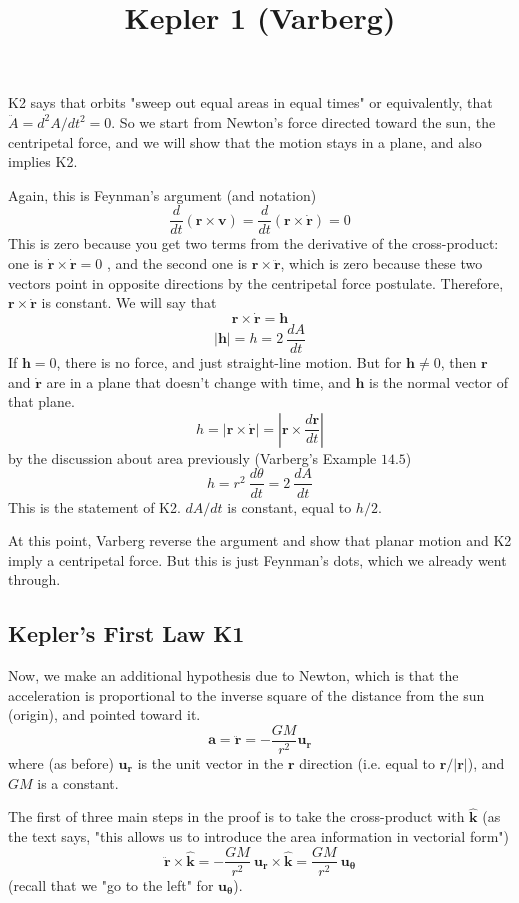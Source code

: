 \documentclass[11pt, oneside]{article}
\title{Kepler 1 (Varberg)}
\date{}
\begin{document}
\maketitle
\Large

K2 says that orbits "sweep out equal areas in equal times" or equivalently, that $\ddot{A} = d^2A/dt^2 = 0$.  So we start from Newton's force directed toward the sun, the centripetal force, and we will show that the motion stays in a plane, and also implies K2.

Again, this is Feynman's argument (and notation)
\[ \frac{d}{dt} ( \mathbf{r} \times \mathbf{v}) = \frac{d}{dt} ( \mathbf{r} \times \dot{\mathbf{r}}) = 0 \]
This is zero because you get two terms from the derivative of the cross-product:  one is $\dot{\mathbf{r}} \times \dot{\mathbf{r}} = 0$ , and the second one is $\mathbf{r} \times \ddot{\mathbf{r}}$, which is zero because these two vectors point in opposite directions by the centripetal force postulate.
Therefore,  $\mathbf{r} \times \dot{\mathbf{r}}$ is constant.  We will say that
\[ \mathbf{r} \times \dot{\mathbf{r}} = \mathbf{h} \]
\[ |\mathbf{h}| = h = 2 \ \frac{dA}{dt} \]
If $\mathbf{h} = 0$, there is no force, and just straight-line motion.  But for  $\mathbf{h} \ne 0$, then $\mathbf{r}$ and $\dot{\mathbf{r}}$ are in a plane that doesn't change with time, and $\mathbf{h}$ is the normal vector of that plane.
\[ h = | \mathbf{r} \times \dot{\mathbf{r}} | = |\mathbf{r} \times \frac{d\mathbf{r}}{dt} | \]
by the discussion about area previously (Varberg's Example $14.5$)
\[ h =  r^2 \ \frac{d \theta}{dt} = 2 \ \frac{dA}{dt} \]
This is the statement of K2.  $dA/dt$ is constant, equal to $h/2$.

At this point, Varberg reverse the argument and show that planar motion and K2 imply a centripetal force.  But this is just Feynman's dots, which we already went through.
\subsection*{Kepler's First Law K1}
Now, we make an additional hypothesis due to Newton, which is that the acceleration is proportional to the inverse square of the distance from the sun (origin), and pointed toward it.
\[ \mathbf{a} = \ddot{\mathbf{r}} = - \frac{GM}{r^2} \mathbf{u_r} \]
where (as before) $\mathbf{u_r}$ is the unit vector in the $\mathbf{r}$ direction (i.e. equal to $\mathbf{r}/|\mathbf{r}|$), and $GM$ is a constant.

The first of three main steps in the proof is to take the cross-product with $\hat{\mathbf{k}}$ (as the text says, "this allows us to introduce the area information in vectorial form")
\[ \ddot{\mathbf{r}} \times \hat{\mathbf{k}} = - \frac{GM}{r^2} \ \mathbf{u_r} \times \hat{\mathbf{k}} = \frac{GM}{r^2} \ \mathbf{u_\theta} \]
(recall that we "go to the left" for $\mathbf{u_\theta}$).  
\end{document}
